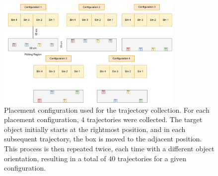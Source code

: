 \begin{figure}[t]
    \centering
    \includegraphics[width=0.8\textwidth]{figures/images/ch5/box_placement.jpg}
    \caption{Placement configuration used for the trajectory collection. For each placement configuration, 4 trajectories were collected. The target object initially starts at the rightmost position, and in each subsequent trajectory, the box is moved to the adjacent position. This process is then repeated twice, each time with a different object orientation, resulting in a total of 40 trajectories for a given configuration.}
    \label{fig:box_placement}
\end{figure}
